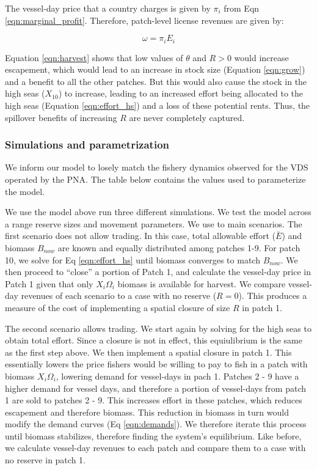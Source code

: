 \documentclass[12pt]{article}
\begin{document}
The vessel-day price that a country charges is given by $\pi_i$ from Eqn \ref{eqn:marginal_profit}. Therefore, patch-level license revenues are given by:

$$
\omega = \pi_iE_i
\label{eqn:license_revenue}
$$

Equation \ref{eqn:harvest} shows that low values of $\theta$ and $R > 0$ would increase escapement, which would lead to an increase in stock size (Equation \ref{eqn:grow}) and a benefit to all the other patches. But this would also cause the stock in the high seas ($X_{10}$) to increase, leading to an increased effort being allocated to the high seas (Equation \ref{eqn:effort_hs}) and a loss of these potential rents. Thus, the spillover benefits of increasing $R$ are never completely captured.

\subsubsection{Simulations and parametrization}

We inform our model to losely match the fishery dynamics observed for the VDS operated by the PNA. The table below contains the values used to parameterize the model.



We use the model above run three different simulations. We test the model across a range reserve sizes and movement parameters. We use to main scenarios. The first scenario does not allow trading. In this case, total allowable effort ($\bar{E}$) and biomass $B_{now}$ are known and equally distributed among patches 1-9. For patch 10, we solve for Eq \ref{eqn:effort_hs} until biomass converges to match $B_{now}$. We then proceed to ``close'' a portion of Patch 1, and calculate the vessel-day price in Patch 1 given that only $X_i\Omega_i$ biomass is available for harvest. We compare vessel-day revenues of each scenario to a case with no reserve ($R = 0$). This produces a measure of the cost of implementing a spatial closure of size $R$ in patch 1.

The second scenario allows trading. We start again by solving for the high seas to obtain total effort. Since a closure is not in effect, this equiulibrium is the same as the first step above. We then implement a spatial closure in patch 1. This essentially lowers the price fishers would be willing to pay to fish in a patch with biomass $X_i\Omega_i$, lowering demand for vessel-days in pach 1. Patches 2 - 9 have a higher demand for vessel days, and therefore a portion of vessel-days from patch 1 are sold to patches 2 - 9. This increases effort in these patches, which reduces escapement and therefore biomass. This reduction in biomass in turn would modify the demand curves (Eq \ref{eqn:demands}). We therefore iterate this process until biomass stabilizes, therefore finding the system's equilibrium. Like before, we calculate vessel-day revenues to each patch and compare them to a case with no reserve in patch 1.
\end{document}
